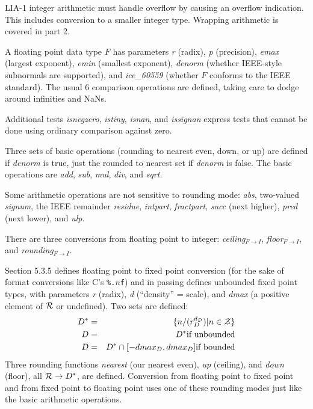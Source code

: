 \documentclass{article}
\begin{document}
LIA-1 integer arithmetic must handle overflow by causing
an overflow indication.  This includes conversion to a 
smaller integer type.  Wrapping arithmetic is covered in
part 2.

A floating point data type $F$ has parameters {\it r}\subF{}
(radix), {\it p}\subF{} (precision), {\it emax}\subF{} (largest
exponent), {\it emin}\subF{} (smallest exponent),
{\it denorm}\subF{} (whether IEEE-style subnormals are supported),
and {\it ice\_60559}\subF{} (whether $F$ conforms to the IEEE
standard).  The usual 6 comparison operations are defined,
taking care to dodge around infinities and NaNs.

Additional tests {\it isnegzero}\subF{}, {\it istiny}\subF{},
{\it isnan}\subF{}, and {\it issignan}\subF{} express tests that
cannot be done using ordinary comparison against zero.

Three sets of basic operations (rounding to nearest even, down,
or up) are defined if {\it denorm}\subF{} is true, just the
rounded to nearest set if {\it denorm}\subF{} is false.
The basic operations are {\it add}, {\it sub}, {\it mul},
{\it div}, and {\it sqrt}.

Some arithmetic operations are not sensitive to rounding
mode: {\it abs}\subF{}, two-valued {\it signum}\subF{},
the IEEE remainder {\it residue}\subF{}, {\it intpart}\subF{},
{\it fractpart}\subF{}, {\it succ}\subF{} (next higher),
{\it pred}\subF{} (next lower), and {\it ulp}\subF{}.

There are three conversions from floating point to integer:
{\it ceiling}${}_{F\rightarrow I}$,
{\it floor}${}_{F\rightarrow I}$, and
{\it rounding}${}_{F\rightarrow I}$.

Section 5.3.5 defines floating point to fixed point conversion
(for the sake of format conversions like C's {\tt \%.$n$f}) and in
passing defines unbounded fixed point types, with parameters
{\it r}\subD{} (radix), {\it d}\subD{} (``density'' = scale),
and {\it dmax}\subD{} (a positive element of $\cal R$ or
undefined).  Two sets are defined:
\begin{eqnarray*}
D^* &=& \{n/(r_D^{d_D}) | n \in {\cal Z}\}\\
D &=& D^* \mbox{if unbounded}\\
D &=& D^* \cap [-dmax_D,dmax_D] \mbox{if bounded}
\end{eqnarray*}
Three rounding functions {\it nearest}\subD{} (our nearest even),
{\it up}\subD{} (ceiling), and
{\it down}\subD{} (floor), all ${\cal R} \rightarrow D^*$, are
defined.  Conversion from floating point to fixed point and
from fixed point to floating point uses one of these rounding
modes just like the basic arithmetic operations.
\end{document}
